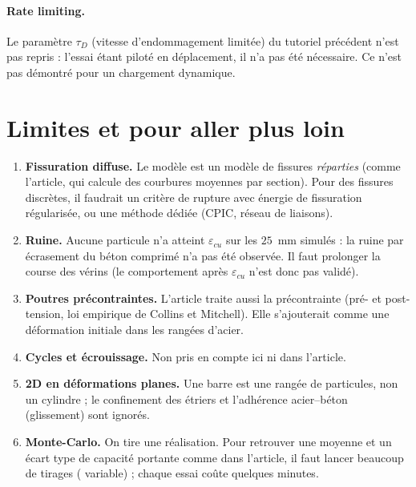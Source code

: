 \documentclass[11pt,a4paper]{article}
\newcommand{\code}[1]{\texttt{\detokenize{#1}}}
\begin{document}
\paragraph{Rate limiting.} Le paramètre $\tau_D$ (vitesse d'endommagement limitée) du tutoriel précédent
n'est pas repris : l'essai étant piloté en déplacement, il n'a pas été nécessaire. Ce n'est pas
démontré pour un chargement dynamique.

\section{Limites et pour aller plus loin}

\begin{enumerate}
  \item \textbf{Fissuration diffuse.} Le modèle est un modèle de fissures \emph{réparties} (comme
        l'article, qui calcule des courbures moyennes par section). Pour des fissures discrètes,
        il faudrait un critère de rupture avec énergie de fissuration régularisée, ou une
        méthode dédiée (CPIC, réseau de liaisons).
  \item \textbf{Ruine.} Aucune particule n'a atteint $\varepsilon_{cu}$ sur les $25$~mm simulés : la ruine
        par écrasement du béton comprimé n'a pas été observée. Il faut prolonger la course des vérins
        (le comportement après $\varepsilon_{cu}$ n'est donc pas validé).
  \item \textbf{Poutres précontraintes.} L'article traite aussi la précontrainte (pré- et
        post-tension, loi empirique de Collins et Mitchell). Elle s'ajouterait comme une déformation
        initiale dans les rangées d'acier.
  \item \textbf{Cycles et écrouissage.} Non pris en compte ici ni dans l'article.
  \item \textbf{2D en déformations planes.} Une barre est une rangée de particules, non un cylindre ;
        le confinement des étriers et l'adhérence acier--béton (glissement) sont ignorés.
  \item \textbf{Monte-Carlo.} On tire une réalisation. Pour retrouver une moyenne et un écart type de
        capacité portante comme dans l'article, il faut lancer beaucoup de tirages (\code{random_seed} variable) ;
        chaque essai coûte quelques minutes.
\end{enumerate}
\end{document}
